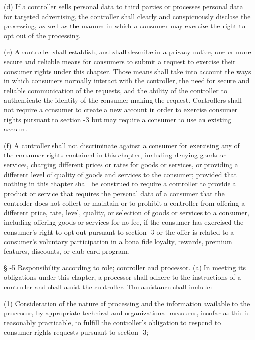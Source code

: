      (d)  If a controller sells personal data to third parties or processes personal data for targeted advertising, the controller shall clearly and conspicuously disclose the processing, as well as the manner in which a consumer may exercise the right to opt out of the processing.

     (e)  A controller shall establish, and shall describe in a privacy notice, one or more secure and reliable means for consumers to submit a request to exercise their consumer rights under this chapter.  Those means shall take into account the ways in which consumers normally interact with the controller, the need for secure and reliable communication of the requests, and the ability of the controller to authenticate the identity of the consumer making the request.  Controllers shall not require a consumer to create a new account in order to exercise consumer rights pursuant to section    -3 but may require a consumer to use an existing account.

     (f)  A controller shall not discriminate against a consumer for exercising any of the consumer rights contained in this chapter, including denying goods or services, charging different prices or rates for goods or services, or providing a different level of quality of goods and services to the consumer; provided that nothing in this chapter shall be construed to require a controller to provide a product or service that requires the personal data of a consumer that the controller does not collect or maintain or to prohibit a controller from offering a different price, rate, level, quality, or selection of goods or services to a consumer, including offering goods or services for no fee, if the consumer has exercised the consumer's right to opt out pursuant to section    -3 or the offer is related to a consumer's voluntary participation in a bona fide loyalty, rewards, premium features, discounts, or club card program.

     §   -5  Responsibility according to role; controller and processor.  (a)  In meeting its obligations under this chapter, a processor shall adhere to the instructions of a controller and shall assist the controller.  The assistance shall include:

     (1)  Consideration of the nature of processing and the information available to the processor, by appropriate technical and organizational measures, insofar as this is reasonably practicable, to fulfill the controller's obligation to respond to consumer rights requests pursuant to section    -3;

